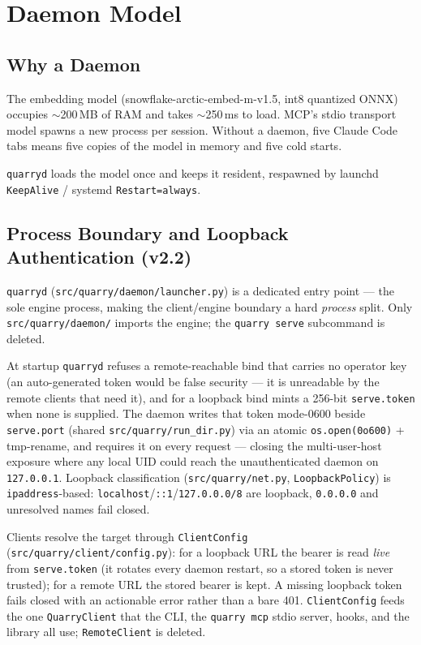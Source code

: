 \documentclass[a4paper,10pt]{article}
\newcommand{\modpath}[1]{\texttt{src/quarry/#1}}
\begin{document}
\section{Daemon Model}

\subsection{Why a Daemon}

The embedding model (snowflake-arctic-embed-m-v1.5, int8 quantized
ONNX) occupies $\sim$200\,MB of RAM and takes $\sim$250\,ms to load.
MCP's stdio transport model spawns a new process per session.  Without
a daemon, five Claude Code tabs means five copies of the model in
memory and five cold starts.

\texttt{quarryd} loads the model once and keeps it resident, respawned
by launchd \texttt{KeepAlive} / systemd \texttt{Restart=always}.

\subsection{Process Boundary and Loopback Authentication (v2.2)}
\label{sec:proc-boundary}

\texttt{quarryd} (\modpath{daemon/launcher.py}) is a dedicated entry
point --- the sole engine process, making the client/engine boundary a
hard \emph{process} split.  Only \modpath{daemon/} imports the engine;
the \texttt{quarry serve} subcommand is deleted.

At startup \texttt{quarryd} refuses a remote-reachable bind that carries
no operator key (an auto-generated token would be false security --- it is
unreadable by the remote clients that need it), and for a loopback bind
mints a 256-bit \texttt{serve.token} when none is supplied.  The daemon
writes that token mode-0600 beside \texttt{serve.port} (shared
\modpath{run\_dir.py}) via an atomic \texttt{os.open(0o600)} +
tmp-rename, and requires it on every request --- closing the
multi-user-host exposure where any local UID could reach the
unauthenticated daemon on \texttt{127.0.0.1}.  Loopback classification
(\modpath{net.py}, \texttt{LoopbackPolicy}) is \texttt{ipaddress}-based:
\texttt{localhost}/\texttt{::1}/\texttt{127.0.0.0/8} are loopback,
\texttt{0.0.0.0} and unresolved names fail closed.

Clients resolve the target through \texttt{ClientConfig}
(\modpath{client/config.py}): for a loopback URL the bearer is read
\emph{live} from \texttt{serve.token} (it rotates every daemon restart,
so a stored token is never trusted); for a remote URL the stored bearer
is kept.  A missing loopback token fails closed with an actionable error
rather than a bare 401.  \texttt{ClientConfig} feeds the one
\texttt{QuarryClient} that the CLI, the \texttt{quarry mcp} stdio server,
hooks, and the library all use; \texttt{RemoteClient} is deleted.
\end{document}
